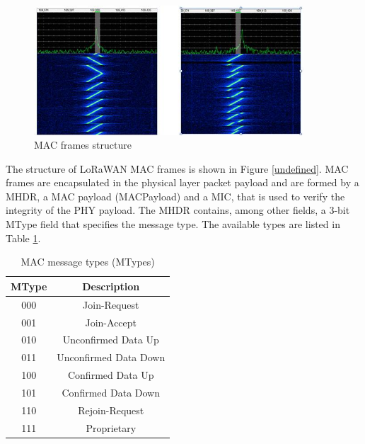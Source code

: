 \begin{figure}[h]
    \centering
    \includegraphics[draft, width=0.9\textwidth]{images/lora-chirps.jpg}
    \caption{MAC frames structure}
    \label{fig:lorawan-mac}
\end{figure}

The structure of LoRaWAN MAC frames is shown in Figure \ref{undefined}.
MAC frames are encapsulated in the physical layer packet payload and are formed by a \gls{MHDR}, a MAC payload (MACPayload) and a \gls{MIC}, that is used to verify the integrity of the PHY payload. 
The \gls{MHDR} contains, among other fields, a 3-bit MType field that specifies the message type. The available types are listed in Table \ref{tab:mtypes}.

\begin{table}[]
\centering

\begin{tabular}{|c|c|}
\hline
\textbf{MType} & \textbf{Description}\\ \hline
 000 & Join-Request  \\ \hline
 001 & Join-Accept \\ \hline
 010 & Unconfirmed Data Up  \\ \hline
 011 & Unconfirmed Data Down  \\ \hline
 100 & Confirmed Data Up \\ \hline 
 101 & Confirmed Data Down \\ \hline
 110 & Rejoin-Request \\ \hline  
 111 & Proprietary \\ \hline 
\end{tabular}
\caption{MAC message types (MTypes)}
\label{tab:mtypes}

\end{table}

